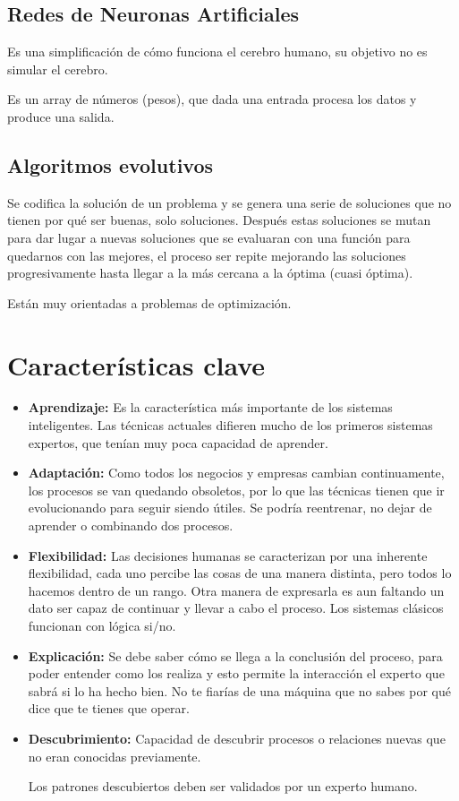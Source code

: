 \documentclass[12pt, twoside, openright]{report} %
\begin{document}
\subsection{Redes de Neuronas Artificiales}
Es una simplificación de cómo funciona el cerebro humano, su objetivo no es simular el cerebro.

Es un array de números (pesos), que dada una entrada procesa los datos y produce una salida.

\subsection{Algoritmos evolutivos}
Se codifica la solución de un problema y se genera una serie de soluciones que no tienen por qué ser buenas, solo soluciones. Después estas soluciones se mutan para dar lugar a nuevas soluciones que se evaluaran con una función para quedarnos con las mejores, el proceso ser repite mejorando las soluciones progresivamente hasta llegar a la más cercana a la óptima (cuasi óptima).

Están muy orientadas a problemas de optimización.

\section{Características clave}
\begin{itemize}
	\item \textbf{Aprendizaje:} Es la característica más importante de los sistemas inteligentes. Las técnicas actuales difieren mucho de los primeros sistemas expertos, que tenían muy poca capacidad de aprender.
	\item \textbf{Adaptación:} Como todos los negocios y empresas cambian continuamente, los procesos se van quedando obsoletos, por lo que las técnicas tienen que ir evolucionando para seguir siendo útiles. Se podría reentrenar, no dejar de aprender o combinando dos procesos.
	\item \textbf{Flexibilidad:} Las decisiones humanas se caracterizan por una inherente flexibilidad, cada uno percibe las cosas de una manera distinta, pero todos lo hacemos dentro de un rango. Otra manera de expresarla es aun faltando un dato ser capaz de continuar y llevar a cabo el proceso. Los sistemas clásicos funcionan con lógica si/no.
	\item \textbf{Explicación:} Se debe saber cómo se llega a la conclusión del proceso, para poder entender como los realiza y esto permite la interacción el experto que sabrá si lo ha hecho bien. No te fiarías de una máquina que no sabes por qué dice que te tienes que operar.
	\item \textbf{Descubrimiento:} Capacidad de descubrir procesos o relaciones nuevas que no eran conocidas previamente.
	      
	      Los patrones descubiertos deben ser validados por un experto humano.
\end{itemize}
\end{document}
